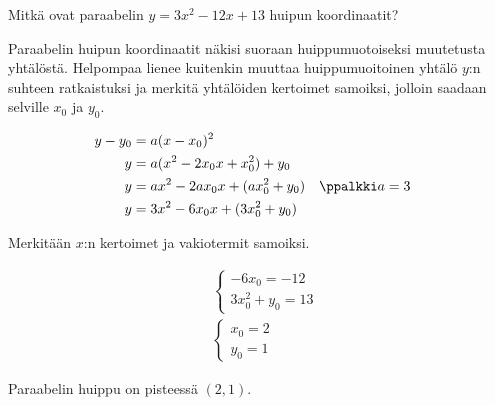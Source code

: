 \begin{esimerkki}
Mitkä ovat paraabelin $y=3x^2-12x+13$ huipun koordinaatit?
\begin{esimratk}
Paraabelin huipun koordinaatit näkisi suoraan huippumuotoiseksi muutetusta yhtälöstä. Helpompaa lienee kuitenkin muuttaa huippumuoitoinen yhtälö $y$:n suhteen ratkaistuksi ja merkitä yhtälöiden kertoimet samoiksi, jolloin saadaan selville $x_0$ ja $y_0$.

\begin{align*}
y-y_0 &= a(x-x_0)^2 \\
y       &= a(x^2-2x_0x+x_0^2)+y_0\\
y       &= ax^2-2ax_0x+(ax_0^2+y_0) &&\ppalkki a=3\\
y       &= 3x^2-6x_0x+(3x_0^2+y_0)
\end{align*}

Merkitään $x$:n kertoimet ja vakiotermit samoiksi.

\begin{align*}
&\begin{cases}
-6x_0=-12 \\
3x_0^2+y_0 =13
\end{cases}\\
&\begin{cases}
x_0=2 \\
y_0 =1
\end{cases}
\end{align*}

Paraabelin huippu on pisteessä $(2, 1)$.

\end{esimratk}
\end{esimerkki}

